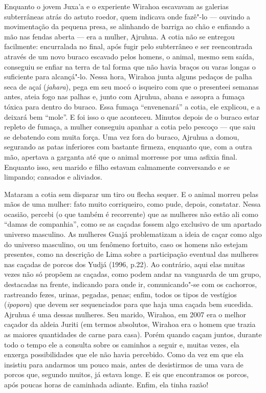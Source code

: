 Enquanto o jovem Juxa'a e o experiente Wirahoa escavavam as galerias
subterrâneas atrás do astuto roedor, quem indicava onde fazê"-lo ---
ouvindo a movimentação da pequena presa, se alinhando de barriga ao chão
e enfiando a mão nas fendas aberta --- era a mulher, Ajruhua. A cotia não
se entregou facilmente: encurralada no final, após fugir pelo
subterrâneo e ser reencontrada através de um novo buraco escavado pelos
homens, o animal, mesmo sem saída, conseguiu se enfiar na terra de tal
forma que não havia braços ou varas longas o suficiente para alcançá"-lo.
Nessa hora, Wirahoa junta alguns pedaços de palha seca de açaí
(\emph{jahara}), pega em seu mocó o isqueiro com que o presenteei
semanas antes, ateia fogo nas palhas e, junto com Ajruhua, abana e
assopra a fumaça tóxica para dentro do buraco. Essa fumaça ``envenenará''
a cotia, ele explicou, e a deixará bem ``mole''. E foi isso o que
aconteceu. Minutos depois de o buraco estar repleto de fumaça, a mulher
conseguiu apanhar a cotia pelo pescoço --- que saiu se debatendo com muita
força. Uma vez fora do buraco, Ajruhua a domou, segurando as patas
inferiores com bastante firmeza, enquanto que, com a outra mão, apertava
a garganta até que o animal morresse por uma asfixia final. Enquanto
isso, seu marido e filho estavam calmamente conversando e se limpando;
cansados e aliviados.

Mataram a cotia sem disparar um tiro ou flecha sequer. E o animal morreu
pelas mãos de uma mulher: fato muito corriqueiro, como pude, depois,
constatar. Nessa ocasião, percebi (o que também é recorrente) que as
mulheres não estão ali como ``damas de companhia'', como se as caçadas
fossem algo exclusivo de um apartado universo masculino. As mulheres
Guajá problematizam a ideia de caçar como algo do universo masculino, ou
um fenômeno fortuito, caso os homens não estejam presentes, como na
descrição de Lima sobre a participação eventual das mulheres nas caçadas
de porcos dos Yudjá (1996, p.22). Ao contrário, aqui elas muitas vezes
não só propõem as caçadas, como podem andar na vanguarda de um grupo,
destacadas na frente, indicando para onde ir, comunicando"-se com os
cachorros, rastreando fezes, urinas, pegadas, penas; enfim, todos os
tipos de vestígios (\emph{ipopora}) que devem ser sequenciados para que
haja uma caçada bem sucedida. Ajruhua é uma dessas mulheres. Seu marido,
Wirahoa, em 2007 era o melhor caçador da aldeia Juriti (em termos
absolutos, Wirahoa era o homem que trazia as maiores quantidades de
carne para casa). Porém quando caçam juntos, durante todo o tempo ele a
consulta sobre os caminhos a seguir e, muitas vezes, ela enxerga
possibilidades que ele não havia percebido. Como da vez em que ela
insistiu para andarmos um pouco mais, antes de desistirmos de uma vara
de porcos que, segundo muitos, já estava longe. E eis que encontramos os
porcos, após poucas horas de caminhada adiante. Enfim, ela tinha razão!

